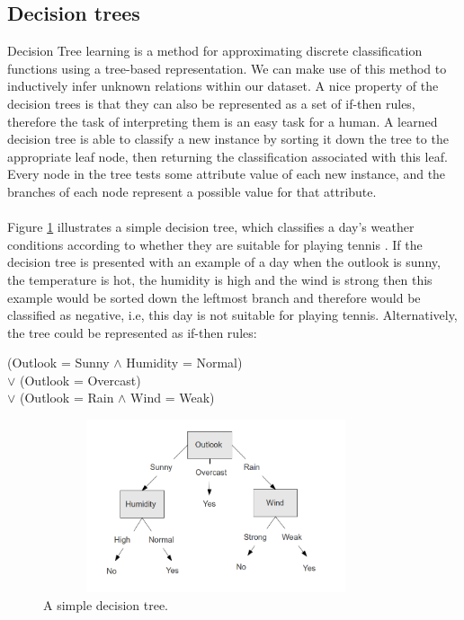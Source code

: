 \subsection{Decision trees}
Decision Tree learning is a method for approximating discrete classification functions using a tree-based representation. We can make use of this method to inductively infer unknown relations within our dataset. A nice property of the decision trees is that they can also be represented as a set of if-then rules, therefore the task of interpreting them is an easy task for a human. A learned decision tree is able to classify a new instance by sorting it down the tree to the appropriate leaf node, then returning the classification associated with this leaf. Every node in the tree tests some attribute value of each new instance, and the branches of each node represent a possible value for that attribute.\\\\
Figure \ref{DecisionTreeExample} illustrates a simple decision tree, which classifies a day's weather conditions according to whether they are suitable for playing tennis \citep{Mitchell1997}. If the decision tree is presented with an example of a day when the outlook is sunny, the temperature is hot, the humidity is high and the wind is strong then this example would be sorted down the leftmost branch and therefore would be classified as negative, i.e, this day is not suitable for playing tennis. Alternatively, the tree could be represented as if-then rules:\\  


\begin{center}
  (Outlook = Sunny $\wedge$ Humidity = Normal)\\
  $\vee$ (Outlook = Overcast)\\
  $\vee$ (Outlook = Rain $\wedge$ Wind = Weak)
\end{center}

\begin{figure}[!htbp]
  \begin{center}
    \includegraphics[height=2in, width=4in]{decision-tree-example}
    \caption{A simple decision tree.}
    \label{DecisionTreeExample}
  \end{center}
\end{figure} 

